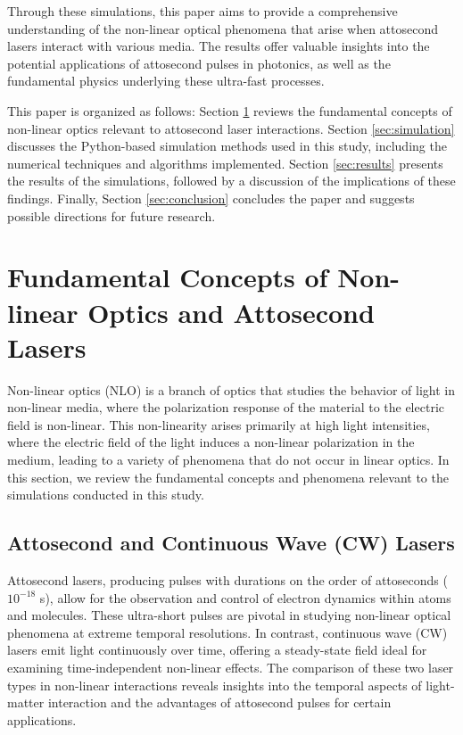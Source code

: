 \documentclass[12pt]{article}
\begin{document}
Through these simulations, this paper aims to provide a comprehensive understanding of the non-linear optical phenomena that arise when attosecond lasers interact with various media. The results offer valuable insights into the potential applications of attosecond pulses in photonics, as well as the fundamental physics underlying these ultra-fast processes.

This paper is organized as follows: Section \ref{sec:concepts} reviews the fundamental concepts of non-linear optics relevant to attosecond laser interactions. Section \ref{sec:simulation} discusses the Python-based simulation methods used in this study, including the numerical techniques and algorithms implemented. Section \ref{sec:results} presents the results of the simulations, followed by a discussion of the implications of these findings. Finally, Section \ref{sec:conclusion} concludes the paper and suggests possible directions for future research.

\newpage

\section{Fundamental Concepts of Non-linear Optics and Attosecond Lasers}\label{sec:concepts}

Non-linear optics (NLO) is a branch of optics that studies the behavior of light in non-linear media, where the polarization response of the material to the electric field is non-linear. This non-linearity arises primarily at high light intensities, where the electric field of the light induces a non-linear polarization in the medium, leading to a variety of phenomena that do not occur in linear optics. In this section, we review the fundamental concepts and phenomena relevant to the simulations conducted in this study.

\subsection{Attosecond and Continuous Wave (CW) Lasers}

Attosecond lasers, producing pulses with durations on the order of attoseconds ($10^{-18}$ s), allow for the observation and control of electron dynamics within atoms and molecules. These ultra-short pulses are pivotal in studying non-linear optical phenomena at extreme temporal resolutions. In contrast, continuous wave (CW) lasers emit light continuously over time, offering a steady-state field ideal for examining time-independent non-linear effects. The comparison of these two laser types in non-linear interactions reveals insights into the temporal aspects of light-matter interaction and the advantages of attosecond pulses for certain applications.
\end{document}
